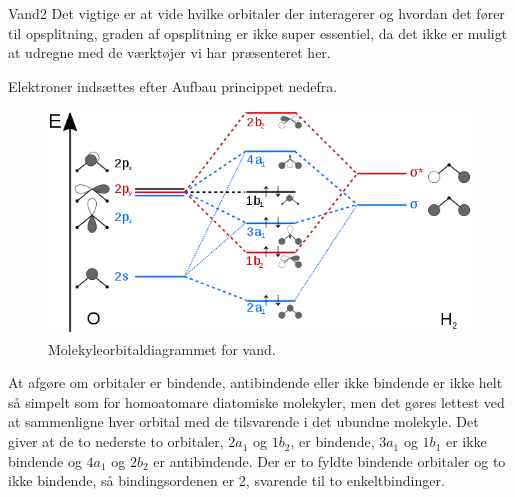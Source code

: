 \begin{opgave}{Vand}{2}
Det vigtige er at vide hvilke orbitaler der interagerer og hvordan det fører til opsplitning, graden af opsplitning er ikke super essentiel, da det ikke er muligt at udregne med de værktøjer vi har præsenteret her.

Elektroner indsættes efter Aufbau princippet nedefra.
\begin{figure}[h]
\center
\includegraphics[width = \textwidth]{Atom-ogMolekylefysik/billeder/H2O-MO-Diagram-wiki.png}
\caption{Molekyleorbitaldiagrammet for vand.}
\end{figure}
\opg At afgøre om orbitaler er bindende, antibindende eller ikke bindende er ikke helt så simpelt som for homoatomare diatomiske molekyler, men det gøres lettest ved at sammenligne hver orbital med de tilsvarende i det ubundne molekyle. Det giver at de to nederste to orbitaler, $2a_1$ og $1b_2$, er bindende, $3a_1$ og $1b_1$ er ikke bindende og $4a_1$ og $2b_2$ er antibindende.
\opg Der er to fyldte bindende orbitaler og to ikke bindende, så bindingsordenen er 2, svarende til to enkeltbindinger.
\end{opgave}
